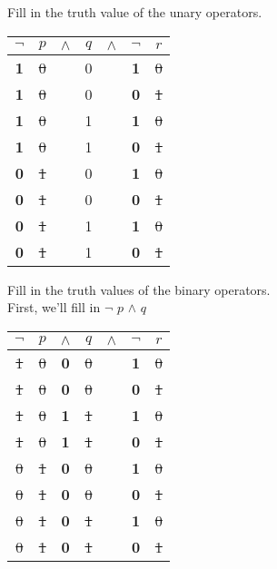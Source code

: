 \documentclass[10pt,a4paper,draft,titlepage,onecolumn]{book}
\begin{document}
Fill in the truth value of the unary operators.
\begin{center}
\begin{tabular}{ |c|c|c|c|c|c|c| }
\hline
 {$\neg$} & $p$ & {$\wedge$} & $q$ & {$\wedge$} & {$\neg$}  & $r$ \\
\hline
       \textbf{1}   & \st{0}   &            & 0   &            &       \textbf{1}    &\st{0}\\
       \textbf{1}   & \st{0}   &            & 0   &            &       \textbf{0}    &\st{1}\\
       \textbf{1}   & \st{0}   &            & 1   &            &       \textbf{1}    &\st{0}\\
       \textbf{1}   & \st{0}   &            & 1   &            &       \textbf{0}    &\st{1}\\
       \textbf{0}   & \st{1}   &            & 0   &            &       \textbf{1}    &\st{0}\\
       \textbf{0}   & \st{1}   &            & 0   &            &       \textbf{0}    &\st{1}\\
       \textbf{0}   & \st{1}   &            & 1   &            &       \textbf{1}    &\st{0}\\
       \textbf{0}   & \st{1}   &            & 1   &            &       \textbf{0}    &\st{1}\\
 \hline
\end{tabular}
\end{center}

Fill in the truth values of the binary operators.\\ First, we'll fill in  {$\neg$} $p$ {$\wedge$}  $q$


\begin{center}
\begin{tabular}{ |c|c|c|c|c|c|c| }
\hline
 {$\neg$} & $p$ & {$\wedge$} & $q$ & {$\wedge$} & {$\neg$}  & $r$ \\
\hline
       \st{1}   & \st{0}   &  \textbf{0}          & \st{0}   &            &       \textbf{1}    &\st{0}\\
       \st{1}   & \st{0}   &  \textbf{0}          & \st{0}   &            &       \textbf{0}    &\st{1}\\
       \st{1}   & \st{0}   &  \textbf{1}          & \st{1}   &            &       \textbf{1}    &\st{0}\\
       \st{1}   & \st{0}   &  \textbf{1}          & \st{1}   &            &       \textbf{0}    &\st{1}\\
       \st{0}   & \st{1}   &  \textbf{0}          & \st{0}   &            &       \textbf{1}    &\st{0}\\
       \st{0}   & \st{1}   &  \textbf{0}          & \st{0}   &            &       \textbf{0}    &\st{1}\\
       \st{0}   & \st{1}   &  \textbf{0}          & \st{1}   &            &       \textbf{1}    &\st{0}\\
       \st{0}   & \st{1}   &  \textbf{0}          & \st{1}   &            &       \textbf{0}    &\st{1}\\
 \hline
\end{tabular}
\end{center}
\end{document}
